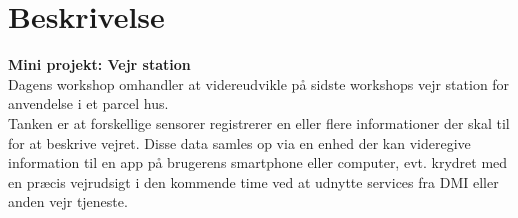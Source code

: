 \section{Beskrivelse}
\textbf{Mini projekt: Vejr station}\\
Dagens workshop omhandler at videreudvikle på sidste workshops vejr station for anvendelse i et parcel hus. \\
Tanken er at forskellige sensorer registrerer en eller flere informationer der skal til for at beskrive vejret. Disse data samles op via en enhed der kan videregive information til en app på brugerens smartphone eller computer, evt. krydret med en præcis vejrudsigt i den kommende time ved at udnytte services fra DMI eller anden vejr tjeneste.